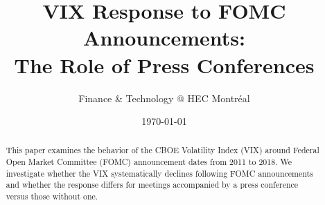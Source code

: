 \documentclass[12pt]{article}
\title{VIX Response to FOMC Announcements:\\ The Role of Press Conferences}
\author{Finance \& Technology @ HEC Montr\'eal}
\date{\today}
\begin{document}
\maketitle

\begin{abstract}
This paper examines the behavior of the CBOE Volatility Index (VIX) around Federal Open Market Committee (FOMC) announcement dates from 2011 to 2018. We investigate whether the VIX systematically declines following FOMC announcements and whether the response differs for meetings accompanied by a press conference versus those without one.
\end{abstract}

\doublespacing






\singlespacing


\end{document}
